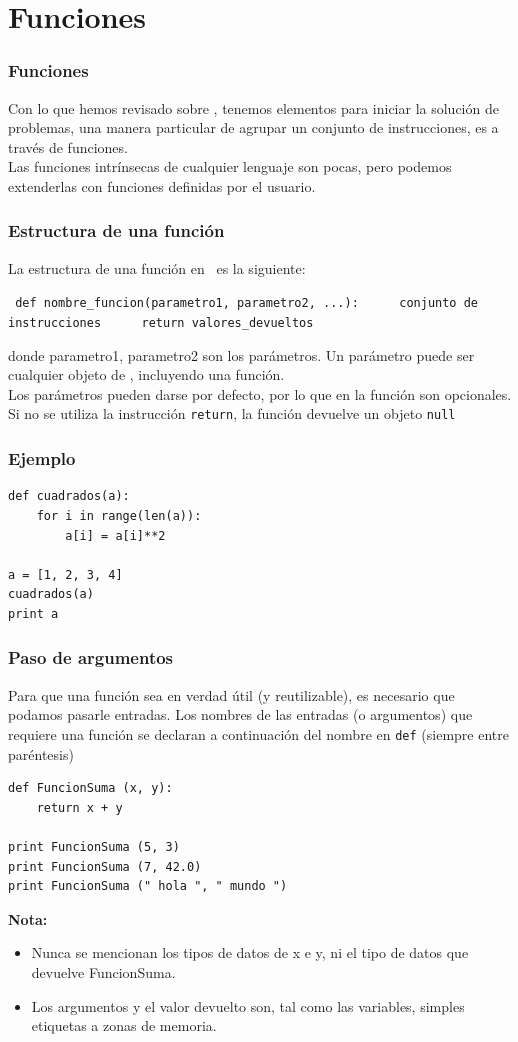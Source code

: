 \section{Funciones}
\begin{frame}
\frametitle{Funciones}
Con lo que hemos revisado sobre \python, tenemos elementos para iniciar la solución de problemas, una manera particular de agrupar un conjunto de instrucciones, es a través de funciones.
\\
\bigskip
Las funciones intrínsecas de cualquier lenguaje son pocas, pero podemos extenderlas con funciones definidas por el usuario.
\end{frame}
\begin{frame}[fragile]
\frametitle{Estructura de una función}
La estructura de una función en \python\ es la siguiente:
\begin{center}
\begin{exampleblock}{}
\verb| def nombre_funcion(parametro1, parametro2, ...):|
\verb|     conjunto de instrucciones|
\verb|     return valores_devueltos|
\end{exampleblock}
\end{center}
donde parametro1, parametro2 son los parámetros. Un parámetro puede ser cualquier objeto de \python, incluyendo una función.
\\
\medskip
Los parámetros pueden darse por defecto, por lo que en la función son opcionales. Si no se utiliza la instrucción \texttt{return}, la función devuelve un objeto \texttt{null}
\end{frame}
\begin{frame}[fragile]
\frametitle{Ejemplo}
\begin{lstlisting}
def cuadrados(a):
    for i in range(len(a)):
        a[i] = a[i]**2

a = [1, 2, 3, 4]
cuadrados(a)
print a
\end{lstlisting}
\end{frame}
\begin{frame}[fragile]
\frametitle{Paso de argumentos}
Para que una función sea en verdad útil (y reutilizable), es necesario que podamos pasarle entradas. Los nombres de las entradas (o argumentos) que requiere una función se declaran a continuación del nombre en \texttt{def} (siempre entre paréntesis)
\end{frame}
\begin{frame}[fragile]
\begin{verbatim}
def FuncionSuma (x, y):
    return x + y

print FuncionSuma (5, 3)
print FuncionSuma (7, 42.0)
print FuncionSuma (" hola ", " mundo ")
\end{verbatim}
\textbf{Nota:} 
\begin{itemize}
\item Nunca se mencionan los tipos de datos de x e y, ni el tipo de datos que devuelve FuncionSuma.
\item Los argumentos y el valor devuelto son, tal como las variables, simples etiquetas a zonas de memoria.
\end{itemize}  
\end{frame}
